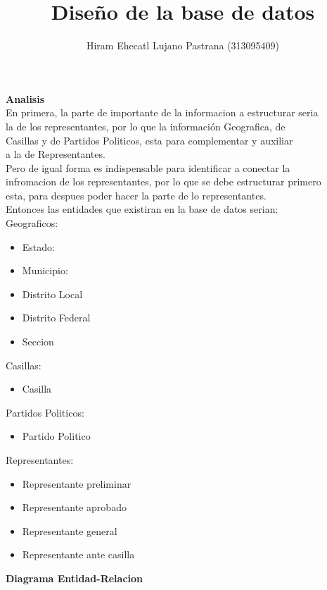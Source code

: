 \documentclass[a4paper,twoside,11pt]{article}
\title{Diseño de la base de datos}
\author{Hiram Ehecatl Lujano Pastrana (313095409)}
\begin{document}
\maketitle

\textbf{Analisis} \\
En primera, la parte de importante de la informacion a estructurar seria\\
la de los representantes, por lo que la información Geografica, de\\
Casillas y de Partidos Politicos, esta para complementar y auxiliar\\
a la de Representantes.\\
Pero de igual forma es indispensable para identificar a conectar la\\
infromacion de los representantes, por lo que se debe estructurar primero\\
esta, para despues poder hacer la parte de lo representantes.\\
Entonces las entidades que existiran en la base de datos serian:\\
Geograficos:
\begin{itemize}
  \item Estado:
  \item Municipio:
  \item Distrito Local
  \item Distrito Federal
  \item Seccion
\end{itemize}
Casillas:
\begin{itemize}
  \item Casilla
\end{itemize}
Partidos Politicos:
\begin{itemize}
  \item Partido Politico
\end{itemize}
Representantes:
\begin{itemize}
  \item Representante preliminar
  \item Representante aprobado
  \item Representante general
  \item Representante ante casilla
\end{itemize}
\textbf{Diagrama Entidad-Relacion}\\
\end{document}
